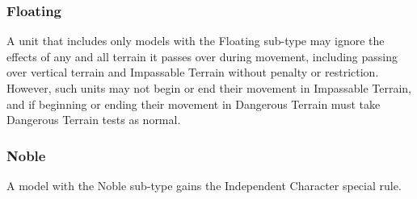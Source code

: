 \subsubsection{Floating} \label{Floating}

A unit that includes only models with the Floating sub-type may ignore the effects of any and all terrain it passes over during movement, including passing over vertical terrain and Impassable Terrain without penalty or restriction. However, such units may not begin or end their movement in Impassable Terrain, and if beginning or ending their movement in Dangerous Terrain must take Dangerous Terrain tests as normal.

\subsubsection{Noble} \label{Noble}

A model with the Noble sub-type gains the Independent Character special rule. \\
